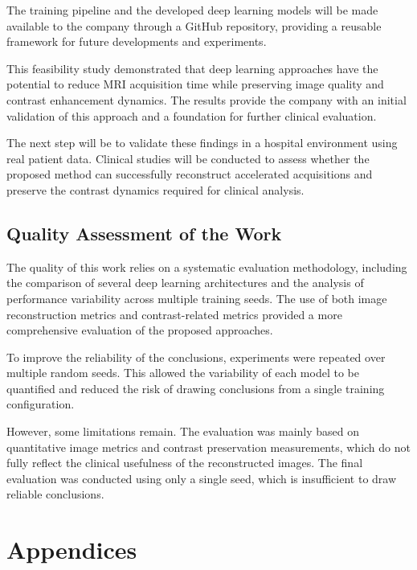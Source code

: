 \documentclass[12pt]{article}
\begin{document}
The training pipeline and the developed deep learning models will be made available to the company through a GitHub repository, providing a reusable framework for future developments and experiments.
\vspace{0.5cm}

This feasibility study demonstrated that deep learning approaches have the potential to reduce MRI acquisition time while preserving image quality and contrast enhancement dynamics. 
The results provide the company with an initial validation of this approach and a foundation for further clinical evaluation.
\vspace{0.5cm}

The next step will be to validate these findings in a hospital environment using real patient data. 
Clinical studies will be conducted to assess whether the proposed method can successfully reconstruct accelerated acquisitions and preserve the contrast dynamics required for clinical analysis.

\subsection{Quality Assessment of the Work}

The quality of this work relies on a systematic evaluation methodology, including the comparison of several deep learning architectures and the analysis of performance variability across multiple training seeds. 
The use of both image reconstruction metrics and contrast-related metrics provided a more comprehensive evaluation of the proposed approaches.
\vspace{0.5cm}

To improve the reliability of the conclusions, experiments were repeated over multiple random seeds. 
This allowed the variability of each model to be quantified and reduced the risk of drawing conclusions from a single training configuration.
\vspace{0.5cm}

However, some limitations remain. 
The evaluation was mainly based on quantitative image metrics and contrast preservation measurements, which do not fully reflect the clinical usefulness of the reconstructed images. 
The final evaluation was conducted using only a single seed, which is insufficient to draw reliable conclusions.



\section{Appendices}
\end{document}
